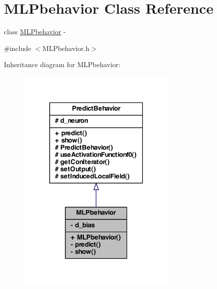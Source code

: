 \hypertarget{class_m_l_pbehavior}{
\section{MLPbehavior Class Reference}
\label{class_m_l_pbehavior}
}


class \hyperlink{class_m_l_pbehavior}{MLPbehavior} -\/  




{\ttfamily \#include $<$MLPbehavior.h$>$}



Inheritance diagram for MLPbehavior:
\nopagebreak
\begin{figure}[H]
\begin{center}
\leavevmode
\includegraphics[width=222pt]{class_m_l_pbehavior__inherit__graph}
\end{center}
\end{figure}


